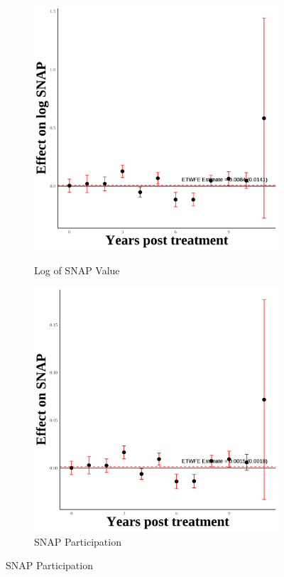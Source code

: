 \documentclass[12pt,english]{article}
\begin{document}
\begin{figure}[H]
  \begin{subfigure}[b]{0.3\textwidth}
    \centering
    \caption{Log of SNAP Value}
    \includegraphics[width=\linewidth]{figures/plot68-ln_snap_event_study-third-two.png}
    \label{fig:ln-snap-third-two}
  \end{subfigure}
  \hfill
  \begin{subfigure}[b]{0.3\textwidth}
    \centering
    \caption{SNAP Participation}
    \includegraphics[width=\linewidth]{figures/plot69-snap_event_study-third-two.png}

\end{subfigure}
\end{figure}
\end{document}
